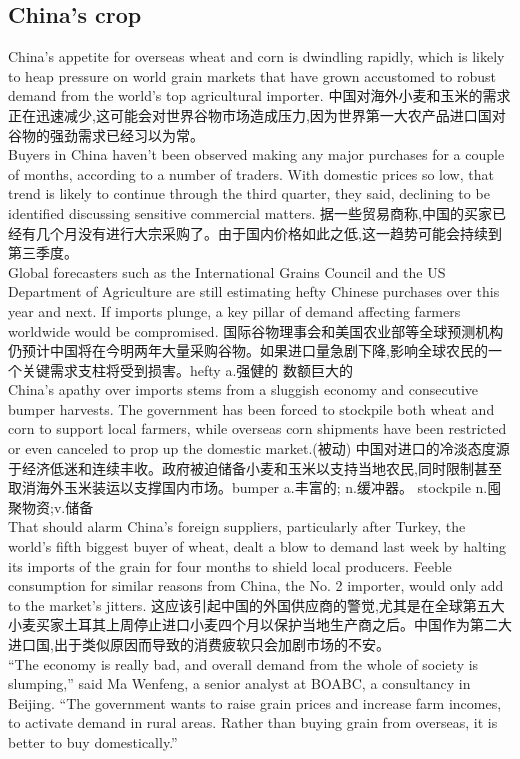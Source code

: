 \documentclass[a4paper,12pt]{article}
\begin{document}
\subsection{China's crop}
China's appetite for overseas wheat and corn is dwindling rapidly, which is likely to heap pressure on world grain markets that have grown accustomed to robust demand from the world's top agricultural importer.
中国对海外小麦和玉米的需求正在迅速减少,这可能会对世界谷物市场造成压力,因为世界第一大农产品进口国对谷物的强劲需求已经习以为常。
\\Buyers in China haven't been observed making any major purchases for a couple of months, according to a number of traders. With domestic prices so low, that trend is likely to continue through the third quarter, they said, declining to be identified discussing sensitive commercial matters.
据一些贸易商称,中国的买家已经有几个月没有进行大宗采购了。由于国内价格如此之低,这一趋势可能会持续到第三季度。
\\Global forecasters such as the International Grains Council and the US Department of Agriculture are still estimating hefty Chinese purchases over this year and next. If imports plunge, a key pillar of demand affecting farmers worldwide would be compromised.
国际谷物理事会和美国农业部等全球预测机构仍预计中国将在今明两年大量采购谷物。如果进口量急剧下降,影响全球农民的一个关键需求支柱将受到损害。hefty a.强健的 数额巨大的
\\China's apathy over imports stems from a sluggish economy and consecutive bumper harvests. The government has been forced to stockpile both wheat and corn to support local farmers, while overseas corn shipments have been restricted or even canceled to prop up the domestic market.(被动)
中国对进口的冷淡态度源于经济低迷和连续丰收。政府被迫储备小麦和玉米以支持当地农民,同时限制甚至取消海外玉米装运以支撑国内市场。bumper a.丰富的; n.缓冲器。 stockpile n.囤聚物资;v.储备
\\That should alarm China's foreign suppliers, particularly after Turkey, the world's fifth biggest buyer of wheat, dealt a blow to demand last week by halting its imports of the grain for four months to shield local producers. Feeble consumption for similar reasons from China, the No. 2 importer, would only add to the market's jitters.
这应该引起中国的外国供应商的警觉,尤其是在全球第五大小麦买家土耳其上周停止进口小麦四个月以保护当地生产商之后。中国作为第二大进口国,出于类似原因而导致的消费疲软只会加剧市场的不安。
\\“The economy is really bad, and overall demand from the whole of society is slumping,” said Ma Wenfeng, a senior analyst at BOABC, a consultancy in Beijing. “The government wants to raise grain prices and increase farm incomes, to activate demand in rural areas. Rather than buying grain from overseas, it is better to buy domestically.”
\end{document}
